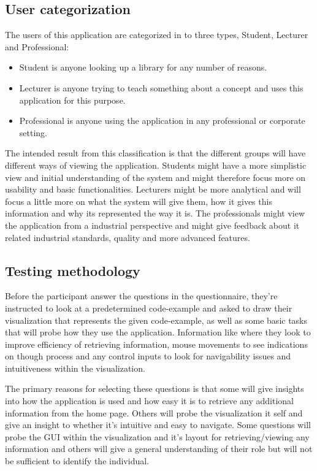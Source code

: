 \subsection{User categorization}
The users of this application are categorized in to three types, Student, Lecturer and Professional: 
\begin{itemize}
    \item Student is anyone looking up a library for any number of reasons. 
    \item Lecturer is anyone trying to teach something about a concept and uses this application for this purpose. 
    \item Professional is anyone using the application in any professional or corporate setting.
\end{itemize}

The intended result from this classification is that the different groups will have different ways of viewing the application. Students might have a more simplistic view and initial understanding of the system and might therefore focus more on usability and basic functionalities. Lecturers might be more analytical and will focus a little more on what the system will give them, how it gives this information and why its represented the way it is. The professionals might view the application from a industrial perspective and might give feedback about \gls{it} related industrial standards, quality and more advanced features.

\subsection{Testing methodology}
Before the participant answer the questions in the questionnaire, they're instructed to look at a predetermined code-example and asked to draw their visualization that represents the given code-example, as well as some basic tasks that will probe how they use the application. Information like where they look to improve efficiency of retrieving information, mouse movements to see indications on though process and any control inputs to look for navigability issues and intuitiveness within the visualization.

The primary reasons for selecting these questions is that some will give insights into how the application is used and how easy it is to retrieve any additional information from the home page. Others will probe the visualization it self and give an insight to whether it's intuitive and easy to navigate. Some questions will probe the GUI within the visualization and it's layout for retrieving/viewing any information and others will give a general understanding of their role but will not be sufficient to identify the individual.

